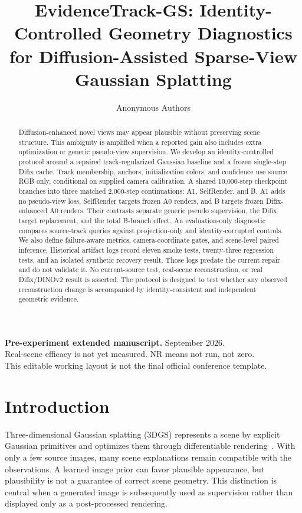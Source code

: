 \documentclass[10pt,twocolumn,letterpaper]{article}
\title{EvidenceTrack-GS: Identity-Controlled Geometry Diagnostics\\for Diffusion-Assisted Sparse-View Gaussian Splatting}
\author{Anonymous Authors}
\date{}
\newcommand{\NR}{\textsf{NR}}
\begin{document}
\maketitle
\begin{center}\small\textbf{Pre-experiment extended manuscript.} September 2026.\\
Real-scene efficacy is not yet measured. \NR{} means not run, not zero.\\
This editable working layout is not the final official conference template.
\end{center}

\begin{abstract}
Diffusion-enhanced novel views may appear plausible without preserving scene structure. This ambiguity is amplified when a reported gain also includes extra optimization or generic pseudo-view supervision. We develop an identity-controlled protocol around a repaired track-regularized Gaussian baseline and a frozen single-step Difix cache. Track membership, anchors, initialization colors, and confidence use source RGB only, conditional on supplied camera calibration. A shared 10,000-step checkpoint branches into three matched 2,000-step continuations: A1, SelfRender, and B. A1 adds no pseudo-view loss, SelfRender targets frozen A0 renders, and B targets frozen Difix-enhanced A0 renders. Their contrasts separate generic pseudo supervision, the Difix target replacement, and the total B-branch effect. An evaluation-only diagnostic compares source-track queries against projection-only and identity-corrupted controls. We also define failure-aware metrics, camera-coordinate gates, and scene-level paired inference. Historical artifact logs record eleven smoke tests, twenty-three regression tests, and an isolated synthetic recovery result. Those logs predate the current repair and do not validate it. No current-source test, real-scene reconstruction, or real Difix/DINOv2 result is asserted. The protocol is designed to test whether any observed reconstruction change is accompanied by identity-consistent and independent geometric evidence.
\end{abstract}

\section{Introduction}
Three-dimensional Gaussian splatting (3DGS) represents a scene by explicit Gaussian primitives and optimizes them through differentiable rendering~\citep{kerbl2023gaussians}. With only a few source images, many scene explanations remain compatible with the observations. A learned image prior can favor plausible appearance, but plausibility is not a guarantee of correct scene geometry. This distinction is central when a generated image is subsequently used as supervision rather than displayed only as a post-processed rendering.
\end{document}
